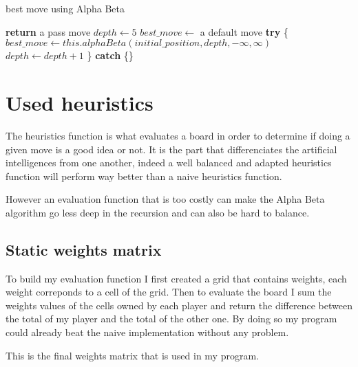 \FloatBarrier
\begin{algorithm}
    \caption{best move using Alpha Beta}
    \begin{algorithmic}[1]
                \State \textbf{return} a pass move
            \EndIf
            \State $depth \gets 5$
            \State $best\_move \gets$ a default move
                \State \textbf{try} \{
                    \State $best\_move \gets this.alphaBeta(initial\_position, depth, -\infty, \infty)$
                    \State $depth \gets depth + 1$
                \State \} \textbf{catch} \{\}
            \EndWhile
        \EndProcedure
    \end{algorithmic}
\end{algorithm}
\FloatBarrier

\section{Used heuristics}

The heuristics function is what evaluates a board in order to determine if doing a given move is a good idea or not.
It is the part that differenciates the artificial intelligences from one another, indeed a well balanced and adapted heuristics function will perform way better than a naive heuristics function.

However an evaluation function that is too costly can make the Alpha Beta algorithm go less deep in the recursion and can also be hard to balance.

\subsection{Static weights matrix}

To build my evaluation function I first created a grid that contains weights, each weight correponds to a cell of the grid.
Then to evaluate the board I sum the weights values of the cells owned by each player and return the difference between the total of my player and the total of the other one.
By doing so my program could already beat the naive implementation without any problem.

This is the final weights matrix that is used in my program.

